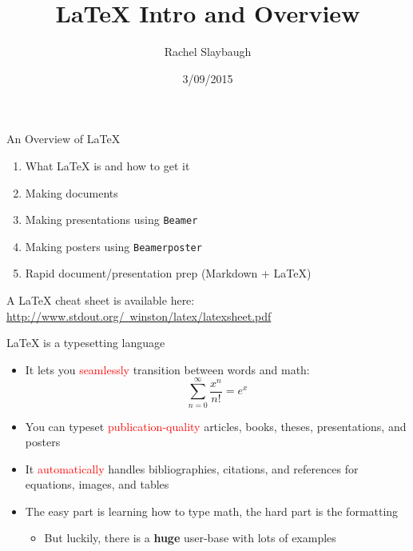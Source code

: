 \documentclass{beamer}
\title{\LaTeX{} Intro and Overview}
\author{Rachel Slaybaugh}
\institute{derived from Laurence Lewis}
\date{3/09/2015}
\begin{document}


\begin{frame}
  \titlepage
\end{frame}


\begin{frame}{An Overview of \LaTeX{}}
	\begin{enumerate}
    	\item What \LaTeX{} is and how to get it
        \item Making documents
        \item Making presentations using \texttt{Beamer}
        \item Making posters using \texttt{Beamerposter}
        \item Rapid document/presentation prep (Markdown + \LaTeX{})
     \end{enumerate}
     \vfill
     A \LaTeX{} cheat sheet is available here:      \href{http://www.stdout.org/~winston/latex/latexsheet.pdf}{http://www.stdout.org/~winston/latex/latexsheet.pdf}
\end{frame}

\begin{frame}{\LaTeX{} is a typesetting language}

	\begin{itemize} %
  	\item It lets you \textcolor{red}{seamlessly} transition between words and math: 
  	$$\sum_{n=0}^\infty\frac{x^n}{n!}=e^x$$
  	\item You can typeset \textcolor{red}{publication-quality} articles, books, theses, presentations, and posters
  	\item It \textcolor{red}{automatically} handles bibliographies, citations, and references for equations, images, and tables 
  	\item The easy part is learning how to type math, the hard part is the formatting
  		\begin{itemize}
    		\item But luckily, there is a \textbf{huge} user-base with lots of examples
    	\end{itemize}
	\end{itemize}
    
\end{frame}
 
\end{document}
